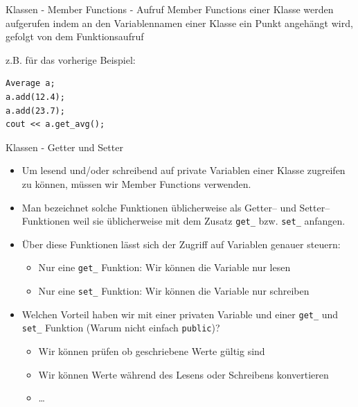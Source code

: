 \documentclass[presentation]{beamer}
\begin{document}
\begin{frame}[fragile,label={sec:orgac0dae3}]{Klassen - Member Functions - Aufruf}
 Member Functions einer Klasse werden aufgerufen indem \alert{an den Variablennamen einer Klasse ein Punkt angehängt wird, gefolgt von dem
Funktionsaufruf}

z.B. für das vorherige Beispiel:
\begin{verbatim}
Average a;
a.add(12.4);
a.add(23.7);
cout << a.get_avg();
\end{verbatim}
\end{frame}
\begin{frame}[fragile,label={sec:org1bc165f}]{Klassen - Getter und Setter}
 \begin{itemize}
\item Um lesend und/oder schreibend auf private Variablen einer Klasse
zugreifen zu können, müssen wir Member Functions verwenden.
\item Man bezeichnet solche Funktionen üblicherweise als \alert{Getter--} und
\alert{Setter--} Funktionen weil sie üblicherweise mit dem Zusatz {\color{solarizedYellow}\texttt{get\_}}
bzw. {\color{solarizedYellow}\texttt{set\_} }anfangen.
\item Über diese Funktionen lässt sich der \alert{Zugriff} auf Variablen
\alert{genauer steuern}:
\begin{itemize}
\item Nur eine {\color{solarizedYellow}\texttt{get\_} }Funktion: Wir können die Variable nur lesen
\item Nur eine {\color{solarizedYellow}\texttt{set\_} }Funktion: Wir können die Variable nur schreiben
\end{itemize}
\item Welchen Vorteil haben wir mit einer privaten Variable und einer
{\color{solarizedYellow}\texttt{get\_} }und {\color{solarizedYellow}\texttt{set\_} }Funktion (Warum nicht einfach {\color{solarizedYellow}\texttt{public}})?
\begin{itemize}
\item Wir können prüfen ob geschriebene Werte gültig sind
\item Wir können Werte während des Lesens oder Schreibens konvertieren
\item \ldots{}
\end{itemize}
\end{itemize}
\end{frame}
\end{document}
